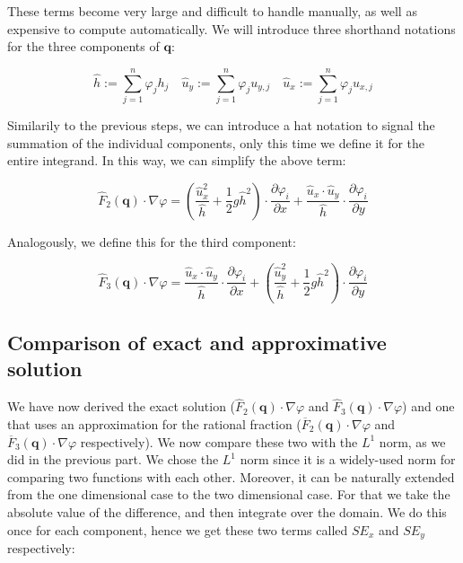 \documentclass{article}
\newcommand{\pd}[2]{\dfrac{\partial #1}{\partial #2}}
\renewcommand{\phi}{\varphi}
\begin{document}
These terms become very large and difficult to handle manually, as well as expensive to compute automatically. We will introduce three shorthand notations for the three components of $\mathbf{q}$:

\begin{equation}
  \label{eq:substitutions-for-all-components-with-hat}
  \widehat{h} := \sum_{j=1}^n \phi_j h_j \quad
  \widehat{u}_y := \sum_{j=1}^n \phi_j u_{y,j} \quad
  \widehat{u}_x := \sum_{j=1}^n \phi_j u_{x,j}
\end{equation}

Similarily to the previous steps, we can introduce a hat notation to signal the summation of the individual components, only this time we define it for the entire integrand. In this way, we can simplify the above term:

\begin{equation}
  \label{eq:stiffness-analysis-second-line-exact-approx-simple}
  \widehat{F}_2(\mathbf{q}) \cdot \nabla \phi =
  \left( \frac{\widehat{u}_x^2}{\widehat{h}} + \frac{1}{2} g \widehat{h}^2 \right) \cdot \pd{\phi_i}{x} +
  \frac{\widehat{u}_x \cdot \widehat{u}_y }{\widehat{h}} \cdot \pd{\phi_i}{y}
\end{equation}

Analogously, we define this for the third component:

\begin{equation}
  \label{eq:stiffness-analysis-third-line-exact-approx-simple}
  \widehat{F}_3(\mathbf{q}) \cdot \nabla \phi=
  \frac{\widehat{u}_x \cdot \widehat{u}_y }{\widehat{h}} \cdot \pd{\phi_i}{x} +
  \left( \frac{\widehat{u}_y^2}{\widehat{h}} + \frac{1}{2} g \widehat{h}^2 \right) \cdot \pd{\phi_i}{y}
\end{equation}

\subsection{Comparison of exact and approximative solution}

We have now derived the exact solution ($\widehat{F}_2(\mathbf{q}) \cdot \nabla \phi$ and $\widehat{F}_3(\mathbf{q}) \cdot \nabla \phi$) and one that uses an approximation for the rational fraction ($\overline{F}_2(\mathbf{q}) \cdot \nabla \phi$ and $\overline{F}_3(\mathbf{q}) \cdot \nabla \phi$ respectively). We now compare these two with the $L^1$ norm, as we did in the previous part. We chose the $L^1$ norm since it is a widely-used norm for comparing two functions with each other. Moreover, it can be naturally extended from the one dimensional case to the two dimensional case. For that we take the absolute value of the difference, and then integrate over the domain. We do this once for each component, hence we get these two terms called $SE_x$ and $SE_y$ respectively:
\end{document}
